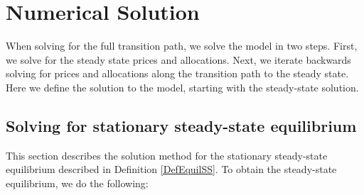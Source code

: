 \chapter{Numerical Solution}
\label{chap:model_soln}
%





When solving for the full transition path, we solve the model in two steps.  First, we solve for the steady state prices and allocations.  Next, we iterate backwards solving for prices and allocations along the transition path to the steady state.  Here we define the solution to the model, starting with the steady-state solution.


\section{Solving for stationary steady-state equilibrium}\label{AppSSsolve}

  This section describes the solution method for the stationary steady-state equilibrium described in Definition \ref{DefEquilSS}.  To obtain the steady-state equilibrium, we do the following:
  
